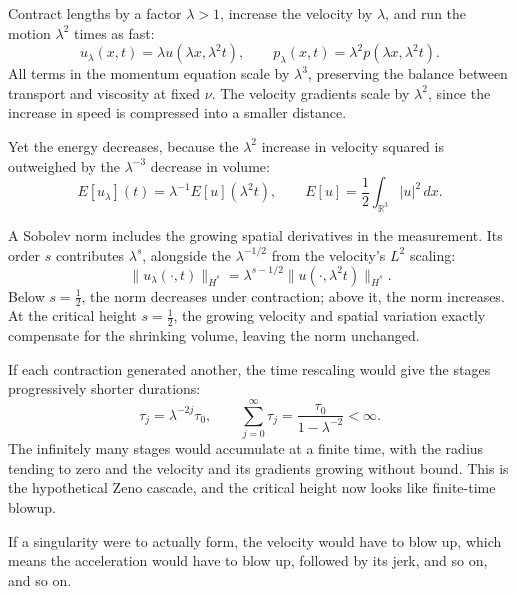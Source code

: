 Contract lengths by a factor \(\lambda>1\), increase the velocity by
\(\lambda\), and run the motion \(\lambda^2\) times as fast:
\[
 u_\lambda(x,t)=\lambda u(\lambda x,\lambda^2t),
 \qquad p_\lambda(x,t)=\lambda^2p(\lambda x,\lambda^2t).
\]
All terms in the momentum equation scale by \(\lambda^3\), preserving
the balance between transport and viscosity at fixed \(\nu\). The velocity
gradients scale by \(\lambda^2\), since the increase in speed is compressed
into a smaller distance.

Yet the energy decreases, because the \(\lambda^2\) increase in velocity
squared is outweighed by the \(\lambda^{-3}\) decrease in volume:
\[
 E[u_\lambda](t)=\lambda^{-1}E[u](\lambda^2t),
 \qquad E[u]=\frac12\int_{\mathbb R^3}|u|^2\,dx.
\]

A Sobolev norm includes the growing spatial derivatives in the measurement.
Its order \(s\) contributes \(\lambda^s\), alongside the
\(\lambda^{-1/2}\) from the velocity's \(L^2\) scaling:
\[
 \|u_\lambda(\cdot,t)\|_{\dot H^s}
 =\lambda^{s-1/2}\|u(\cdot,\lambda^2t)\|_{\dot H^s}.
\]
Below \(s=\tfrac12\), the norm decreases under contraction; above it,
the norm increases. At the critical height \(s=\tfrac12\), the growing
velocity and spatial variation exactly compensate for the shrinking
volume, leaving the norm unchanged.

If each contraction generated another, the time rescaling would give the
stages progressively shorter durations:
\[
 \tau_j=\lambda^{-2j}\tau_0,
 \qquad \sum_{j=0}^{\infty}\tau_j
 =\frac{\tau_0}{1-\lambda^{-2}}<\infty.
\]
The infinitely many stages would accumulate at a finite time, with the
radius tending to zero and the velocity and its gradients growing without
bound. This is the hypothetical Zeno cascade, and the critical height now
looks like finite-time blowup.

If a singularity were to actually form, the velocity would have to blow up,
which means the acceleration would have to blow up, followed by its jerk,
and so on, and so on.

